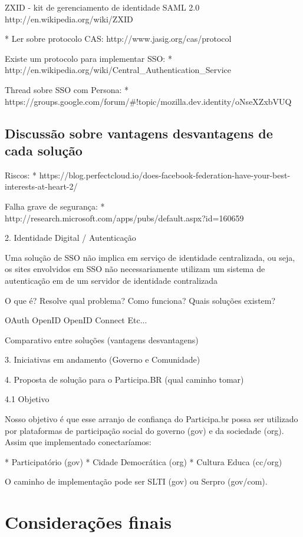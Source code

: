 \documentclass[11pt]{article}
\begin{document}
ZXID - kit de gerenciamento de identidade SAML 2.0
http://en.wikipedia.org/wiki/ZXID


* Ler sobre protocolo CAS: http://www.jasig.org/cas/protocol


Existe um protocolo para implementar SSO:
   * http://en.wikipedia.org/wiki/Central\_Authentication\_Service

Thread sobre SSO com Persona:
   * https://groups.google.com/forum/\#!topic/mozilla.dev.identity/oNseXZxbVUQ


\subsection{Discussão sobre vantagens desvantagens de cada solução}

Riscos:
* https://blog.perfectcloud.io/does-facebook-federation-have-your-best-interests-at-heart-2/

Falha grave de segurança:
* http://research.microsoft.com/apps/pubs/default.aspx?id=160659

2. Identidade Digital / Autenticação

Uma solução de SSO não implica em serviço de identidade centralizada, ou seja, os sites envolvidos em SSO não
necessariamente utilizam um sistema de autenticação em de um servidor de identidade contralizada


O que é?
Resolve qual problema?
Como funciona?
Quais soluções existem?

OAuth
OpenID
OpenID Connect
Etc...

Comparativo entre soluções (vantagens desvantagens)

3. Iniciativas em andamento (Governo e Comunidade)

4. Proposta de solução para o Participa.BR (qual caminho tomar)

4.1 Objetivo

Nosso objetivo é que esse arranjo de confiança do Participa.br possa ser utilizado por plataformas de participação social do governo (gov) e da sociedade (org). Assim que implementado conectaríamos:

* Participatório (gov)
* Cidade Democrática (org)
* Cultura Educa (cc/org)

O caminho de implementação pode ser SLTI (gov) ou Serpro (gov/com).


\section{Considerações finais}
\end{document}
